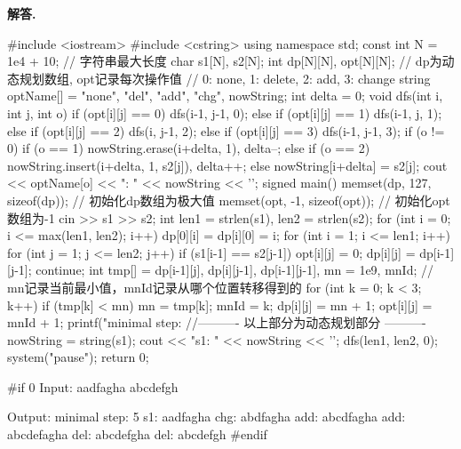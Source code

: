 \documentclass[12pt, a4paper, oneside]{ctexart}
\numberwithin{equation}{section}  %
\newenvironment{solution}[1][]{\par\noindent\textbf{#1解答. }}{\smallskip\par}  %
\begin{document}
\begin{solution}
    \begin{cppcode}
#include <iostream>
#include <cstring>
using namespace std;
const int N = 1e4 + 10;  // 字符串最大长度
char s1[N], s2[N];
int dp[N][N], opt[N][N];  // dp为动态规划数组, opt记录每次操作值
// 0: none, 1: delete, 2: add, 3: change
string optName[] = {"none", "del", "add", "chg"}, nowString;
int delta = 0;
void dfs(int i, int j, int o) {
    if (opt[i][j] == 0) dfs(i-1, j-1, 0);
    else if (opt[i][j] == 1) dfs(i-1, j, 1);
    else if (opt[i][j] == 2) dfs(i, j-1, 2);
    else if (opt[i][j] == 3) dfs(i-1, j-1, 3);
    if (o != 0) {
        if (o == 1) nowString.erase(i+delta, 1), delta--;
        else if (o == 2) nowString.insert(i+delta, 1, s2[j]), delta++;
        else nowString[i+delta] = s2[j];
        cout << optName[o] << ": " << nowString << '\n';
    }
}
signed main() {
    memset(dp, 127, sizeof(dp));  // 初始化dp数组为极大值
    memset(opt, -1, sizeof(opt));  // 初始化opt数组为-1
    cin >> s1 >> s2;
    int len1 = strlen(s1), len2 = strlen(s2);
    for (int i = 0; i <= max(len1, len2); i++) dp[0][i] = dp[i][0] = i;
    for (int i = 1; i <= len1; i++) {
        for (int j = 1; j <= len2; j++) {
            if (s1[i-1] == s2[j-1]) {
                opt[i][j] = 0;
                dp[i][j] = dp[i-1][j-1];
                continue;
            }
            int tmp[] = {dp[i-1][j], dp[i][j-1], dp[i-1][j-1]}, mn = 1e9, mnId;  // mn记录当前最小值，mnId记录从哪个位置转移得到的
            for (int k = 0; k < 3; k++) {
                if (tmp[k] < mn) {
                    mn = tmp[k];
                    mnId = k;
                }
            }
            dp[i][j] = mn + 1;
            opt[i][j] = mnId + 1;
        }
    }
    printf("minimal step: %
    //---------- 以上部分为动态规划部分 ----------
    nowString = string(s1);
    cout << "s1:  " << nowString << '\n';
    dfs(len1, len2, 0);
    system("pause");
    return 0;
}

#if 0
Input:
aadfagha
abcdefgh

Output:
minimal step: 5
s1:  aadfagha
chg: abdfagha
add: abcdfagha
add: abcdefagha
del: abcdefgha
del: abcdefgh
#endif
    \end{cppcode}
\end{solution}
\end{document}
